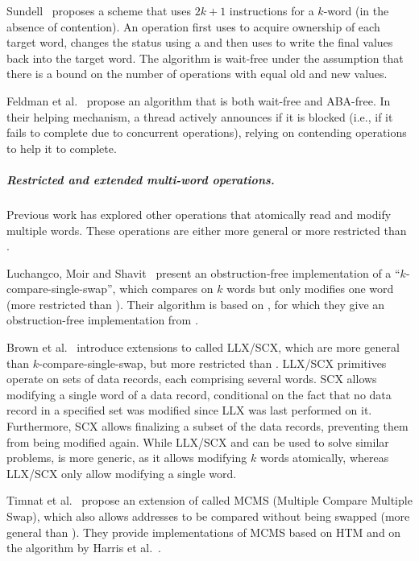 Sundell~\cite{sundell11} proposes a scheme that uses $2k+1$ \cas{} instructions for a $k$-word \mcas{} (in the absence of contention). An \mcas{} operation first uses \cas{} to acquire ownership of each target word, changes the status using a \cas{} and then uses \cas{} to write the final values back into the target word. The algorithm is wait-free under the assumption that there is a bound on the number of \mcas{} operations with equal old and new values. 

Feldman et al.~\cite{feldman15} propose an algorithm that is both wait-free and ABA-free. In their helping mechanism, a thread actively announces if it is blocked (i.e., if it fails to complete due to concurrent \mcas{} operations), relying on contending operations to help it to complete.

\subparagraph{Restricted and extended multi-word operations.}

Previous work has explored other operations that atomically read and modify multiple words. These operations are either more general or more restricted than \mcas{}.

Luchangco, Moir and Shavit~\cite{luchangco03} present an obstruction-free
implementation of a ``$k$-compare-single-swap'', which compares on $k$ words but only modifies one word (more restricted than \mcas{}). Their algorithm is based on \llsc{}, for which they give an obstruction-free implementation from \cas{}.

Brown et al.~\cite{brown13} introduce extensions to \llsc{} called \textsc{LLX/SCX}, which are more general than $k$-compare-single-swap, but more restricted than \mcas{}.
\textsc{LLX/SCX} primitives operate on sets of data records, each comprising several words. 
\textsc{SCX} allows modifying a single word of a data record, conditional on the fact that no data record in a specified set was modified since \textsc{LLX} was last performed on it. 
Furthermore, \textsc{SCX} allows finalizing a subset of the data records, preventing them from being modified again.
While \textsc{LLX/SCX} and \mcas{} can be used to solve similar problems, \mcas{} is more generic, as it allows modifying $k$ words atomically, whereas \textsc{LLX/SCX} only allow modifying a single word.

Timnat et al.~\cite{timnat15} propose an extension of \mcas{} called \textsc{MCMS} (Multiple Compare Multiple Swap), which also allows addresses to be compared without being swapped (more general than \mcas{}). They provide implementations of \textsc{MCMS} based on HTM and on the algorithm by Harris et al.~\cite{harris02}.